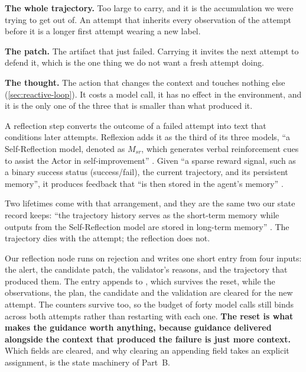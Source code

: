 \bi

\item \textbf{The whole trajectory.} Too large to carry, and it is the accumulation we were trying
to get out of. An attempt that inherits every observation of the attempt before it is a longer first
attempt wearing a new label.

\item \textbf{The patch.} The artifact that just failed. Carrying it invites the next attempt to
defend it, which is the one thing we do not want a fresh attempt doing.

\item \textbf{The thought.} The action that changes the context and touches nothing else
(\cref{sec:reactive-loop}). It costs a model call, it has no effect in the environment, and it is
the only one of the three that is smaller than what produced it.

\ei

\begin{definition}
\label{def:reflection}
A reflection step converts the outcome of a failed attempt into text that conditions later attempts.
Reflexion adds it as the third of its three models, ``a Self-Reflection model, denoted as $M_{sr}$,
which generates verbal reinforcement cues to assist the Actor in
self-improvement'' \citep[\S3]{shinn2023reflexion}. Given ``a sparse reward signal, such as a binary
success status (success/fail), the current trajectory, and its persistent memory'', it produces
feedback that ``is then stored in the agent's memory'' \citep[\S3]{shinn2023reflexion}.
\end{definition}

Two lifetimes come with that arrangement, and they are the same two our state record keeps: ``the
trajectory history serves as the short-term memory while outputs from the Self-Reflection model are
stored in long-term memory'' \citep[\S3]{shinn2023reflexion}. The trajectory dies with the attempt;
the reflection does not.

Our reflection node runs on rejection and writes one short entry from four inputs: the alert, the
candidate patch, the validator's reasons, and the trajectory that produced them. The entry appends
to , which survives the reset, while the observations, the plan, the candidate
and the validation are cleared for the new attempt. The counters survive too, so the budget of forty
model calls still binds across both attempts rather than restarting with each one.
\textbf{The reset is what makes the guidance worth anything, because guidance delivered alongside
the context that produced the failure is just more context.} Which fields are cleared, and why
clearing an appending field takes an explicit assignment, is the state machinery of Part~B.

